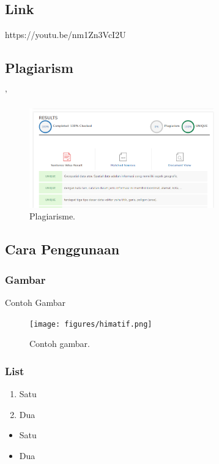 \subsection{Link}
https://youtu.be/nm1Zn3VcI2U
\subsection{Plagiarism}'\begin{figure}[H]
	\includegraphics[width=8cm]{figures/Tugas1/1174091/plagiarisme.png}
	\centering
	\caption{Plagiarisme.}
\end{figure}	

\subsection{Cara Penggunaan}
\subsubsection{Gambar}

\hfill\break

Contoh Gambar
\begin{figure}[H]
	\texttt{[image: figures/himatif.png]}
	\centering
	\caption{Contoh gambar.}
\end{figure}

\subsubsection{List}
\begin{enumerate}
	\item Satu
	\item Dua
\end{enumerate}

\begin{itemize}
	\item Satu
	\item Dua
\end{itemize}

